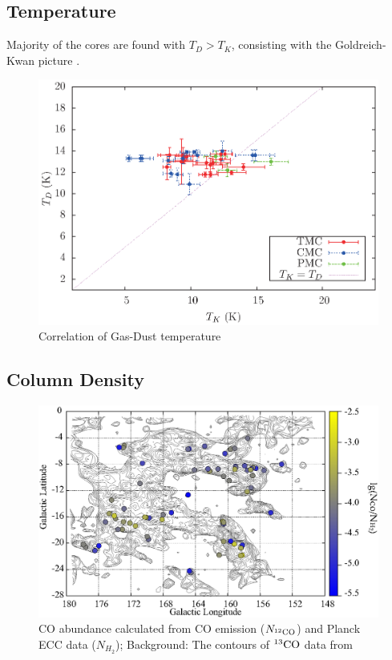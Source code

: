 \documentclass{article}
\newcommand{\cob}{$\rm ^{13}CO$ }
\begin{document}
\subsection{Temperature}
    Majority of the cores are found with $T_D>T_K$, consisting with the  Goldreich- Kwan picture \citep{1974ApJ...189..441G}.
        \begin{figure}[H]
          \centering
          \includegraphics[totalheight=40 mm]{Gas-Dust_EB_Core.eps}
          \caption{Correlation of Gas-Dust temperature} \label{fig:ECCTemp_DIstribution}
       \end{figure}
\subsection{Column Density}
\begin{figure}[h]
\centering
\includegraphics[totalheight=55mm]{SpatiaDist_Abundance_Overlay.eps}
\caption{CO abundance calculated from CO emission ($N_{^{12}\rm CO}$) and Planck ECC data ($N_{H_2}$); Background: The contours of \cob data from \citep{2001ApJ...547..792D}}
\end{figure}
\newpage
\end{document}
